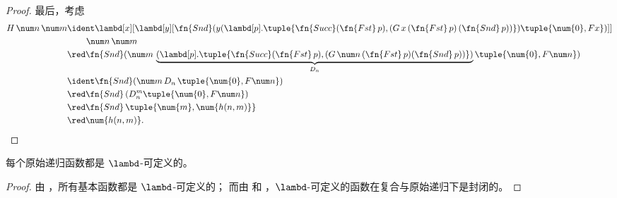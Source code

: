 \documentclass[../../../include/open-logic-section]{subfiles}
\begin{document}
\begin{proof}
  最后，考虑
  \begin{align*}
    H\,\num n\,\num m &\ident \lambd[x][\lambd[y][\fn{Snd} (y
        (\lambd[p].\tuple{\fn{Succ} (\fn{Fst}\, p), (G\, x\,
          (\fn{Fst}\, p)\, (\fn{Snd}\, p))}) \tuple{\num{0}, F x})]]\\
    & \qquad\,\num n\, \num m\\
    & \red \fn{Snd} (\num m \,
    \underbrace{(\lambd[p].\tuple{\fn{Succ} (\fn{Fst}\, p), (G \,\num n\,
      (\fn{Fst}\, p) (\fn{Snd}\, p))})}_{D_n} \tuple{\num{0}, F \num n})\\
    & \ident \fn{Snd} (\num m \, D_n\, \tuple{\num{0}, F \num n})\\
    & \red \fn{Snd} \,(D_n^m  \tuple{\num{0}, F \num n})\\
    & \red \fn{Snd} \,\tuple{\num{m}, \num{h(n, m)}} \\
    & \red \num{h(n,m)}.
  \end{align*}
\end{proof}

\begin{prop}
  每个原始递归函数都是 $\lambd$-可定义的。
\end{prop}

\begin{proof}
  由 ，所有基本函数都是 $\lambd$-可定义的；
  而由  和 ，$\lambd$-可定义的函数在复合与原始递归下是封闭的。
\end{proof}
\end{document}
